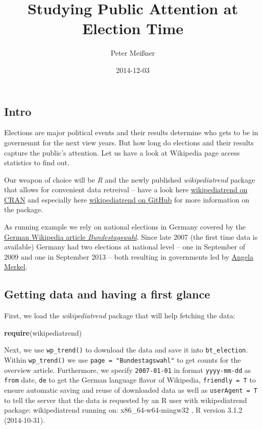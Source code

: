 \documentclass[]{article}
\title{Studying Public Attention at Election Time}
\author{Peter Meißner}
\date{2014-12-03}
\newenvironment{Shaded}{\begin{snugshade}}{\end{snugshade}}
\newcommand{\KeywordTok}[1]{\textcolor[rgb]{0.13,0.29,0.53}{\textbf{{#1}}}}
\newcommand{\NormalTok}[1]{{#1}}
\begin{document}
\maketitle


\subsection{Intro}\label{intro}

Elections are major political events and their results determine who
gets to be in governemnt for the next view years. But how long do
elections and their results capture the public's attention. Let us have
a look at Wikipedia page access statistics to find out.

Our weapon of choice will be \emph{R} and the newly published
\emph{wikipediatrend} package that allows for convenient data retreival
-- have a look here
\href{http://cran.r-project.org/web/packages/wikipediatrend/index.html}{wikipediatrend
on CRAN} and especially here
\href{https://github.com/petermeissner/wikipediatrend}{wikipediatrend on
GitHub} for more information on the package.

As running example we rely on national elections in Germany covered by
the \href{http://de.wikipedia.org/wiki/Bundestagswahl}{German Wikipedia
article \emph{Bundestagswahl}}. Since late 2007 (the first time data is
available) Germany had two elections at national level -- one in
September of 2009 and one in September 2013 -- both resulting in
governments led by
\href{http://en.wikipedia.org/wiki/Angela_Merkel}{Angela Merkel}.

\subsection{Getting data and having a first
glance}\label{getting-data-and-having-a-first-glance}

First, we load the \emph{wikipediatrend} package that will help fetching
the data:

\begin{Shaded}
\begin{Highlighting}[]
\KeywordTok{require}\NormalTok{(wikipediatrend)}
\end{Highlighting}
\end{Shaded}

Next, we use \texttt{wp\_trend()} to download the data and save it into
\texttt{bt\_election}. Within \texttt{wp\_trend()} we use
\texttt{page = "Bundestagswahl"} to get counts for the overview article.
Furthermore, we specify \texttt{2007-01-01} in format
\texttt{yyyy-mm-dd} as \texttt{from} date, \texttt{de} to get the German
language flavor of Wikipedia, \texttt{friendly = T} to ensure automatic
saving and reuse of downloaded data as well as \texttt{userAgent = T} to
tell the server that the data is requested by an R user with
wikipediatrend package: wikipediatrend running on: x86\_64-w64-mingw32 ,
R version 3.1.2 (2014-10-31).
\end{document}
